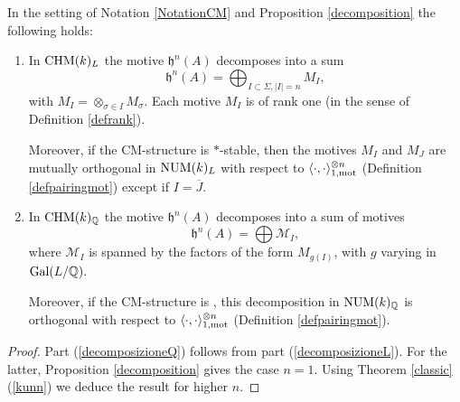 \begin{proposition}
\notready\label{primadecomposizione}
In the setting of Notation \ref{NotationCM} and Proposition \ref{decomposition}  the following holds:

\begin{enumerate}


\item\label{decomposizioneL} In $\mathrm{CHM} (k)_{L}$ the motive $\mathfrak{h}^n(A)$ decomposes into a sum
\[\mathfrak{h}^n(A) =\bigoplus_{I\subset \Sigma, \vert I \vert = n} M_I,\]
with $M_I= \otimes_{\sigma \in I}M_\sigma$. Each motive $M_I$ is of rank one (in the sense of Definition \ref{defrank}).

Moreover, if the CM-structure is $*$-stable, then the motives $M_I$ and $M_J$ are mutually orthogonal  in $\mathrm{NUM}(k)_L$ with respect to $\langle \cdot, \cdot \rangle_{1,\mathrm{mot}}^{\otimes n}$ (Definition \ref{defpairingmot}) except if $I = \overline{J}$.

\item\label{decomposizioneQ} In $\mathrm{CHM} (k)_{\mathbb{Q}}$ the motive $\mathfrak{h}^n(A)$ decomposes into a sum of motives
\[\mathfrak{h}^n(A) =\bigoplus  \mathcal{M}_I,\]
where $\mathcal{M}_I$ is spanned by the factors of the form $M_{g(I)}$, with $g$ varying in $\textnormal{Gal}(L/\mathbb{Q}).$

Moreover, if the CM-structure is , this decomposition in $\mathrm{NUM}(k)_{\mathbb{Q}}$  is orthogonal with respect to $\langle \cdot, \cdot \rangle_{1,\mathrm{mot}}^{\otimes n}$  (Definition \ref{defpairingmot}).

\end{enumerate}
\end{proposition}
\begin{proof}
Part (\ref{decomposizioneQ}) follows from part (\ref{decomposizioneL}). For the latter, Proposition \ref{decomposition} gives the case $n=1$. Using Theorem \ref{classic}(\ref{kunn}) we deduce the result for higher $n$.
\end{proof}


